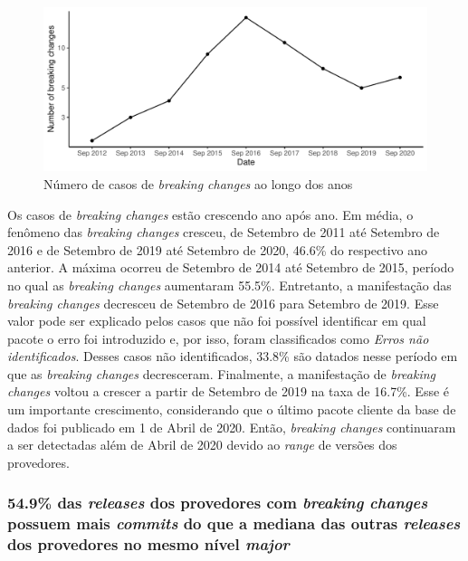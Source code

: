 \begin{figure}
	\centering
	\includegraphics[scale=0.7]{figuras/plot_rq1_2.pdf}
	\caption{Número de casos de \textit{breaking changes} ao longo dos anos}
	\label{fig:plot_rq1_2}
\end{figure}{}

Os casos de \textit{breaking changes} estão crescendo ano após ano. Em média, o fenômeno das \textit{breaking changes} cresceu, de Setembro de 2011 até Setembro de 2016 e de Setembro de 2019 até Setembro de 2020, 46.6\% do respectivo ano anterior. A máxima ocorreu de Setembro de 2014 até Setembro de 2015, período no qual as \textit{breaking changes} aumentaram 55.5\%. Entretanto, a manifestação das \textit{breaking changes} decresceu de Setembro de 2016 para Setembro de 2019. Esse valor pode ser explicado pelos casos que não foi possível identificar em qual pacote o erro foi introduzido e, por isso, foram classificados como \textit{Erros não identificados}. Desses casos não identificados, 33.8\% são datados nesse período em que as \textit{breaking changes} decresceram. Finalmente, a manifestação de \textit{breaking changes} voltou a crescer a partir de Setembro de 2019 na taxa de 16.7\%. Esse é um importante crescimento, considerando que o último pacote cliente da base de dados foi publicado em 1 de Abril de 2020. Então, \textit{breaking changes} continuaram a ser detectadas além de Abril de 2020 devido ao \textit{range} de versões dos provedores.

\subsubsection{54.9\% das \textit{releases} dos provedores com \textit{breaking changes} possuem mais \textit{commits} do que a mediana das outras \textit{releases} dos provedores no mesmo nível \textit{major}}


